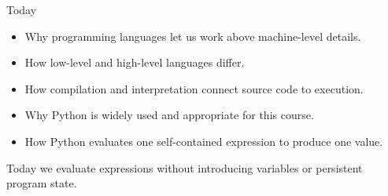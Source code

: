 \documentclass[aspectratio=169,10pt]{beamer}
\begin{document}
\makedecktitle

\begin{frame}{Today}

  \begin{itemize}

    \item Why programming languages let us work above machine-level details.

    \item How low-level and high-level languages differ.

    \item How compilation and interpretation connect source code to execution.

    \item Why Python is widely used and appropriate for this course.

    \item How Python evaluates one self-contained expression to produce one value.

  \end{itemize}

  \begin{keyidea}

    Today we evaluate expressions without introducing variables or persistent program state.

  \end{keyidea}

\end{frame}

\end{document}
